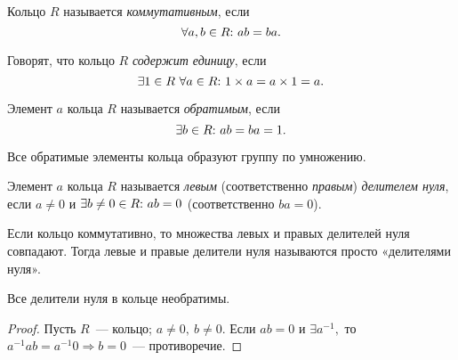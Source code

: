         \begin{comment}
        \begin{definition}
            Кольцо $R$ называется \textit{ассоциативным}, если 
		\begin{equation*}
			\forall a, b, c \in R\suchthat (ab)c = a(bc).
		\end{equation*}
	\end{definition}
        \end{comment}
	\begin{definition}
		Кольцо $R$ называется \textit{коммутативным}, если 
		\begin{equation*}
			\forall a, b \in R{:}{ } \  ab = ba.
		\end{equation*}
	\end{definition}
        \begin{definition}
            Говорят, что кольцо $R$ \textit{содержит единицу}, если
            \begin{equation*}
                \exists 1 \in R \ \forall a \in R{:}{ } \  1 \times a = a \times 1 = a.
            \end{equation*}
        \end{definition}
	\begin{definition}
		Элемент $a$ кольца $R$ называется \textit{обратимым}, если 
		\begin{equation*}
			\exists b \in R {:}{ } \  ab = ba = 1.
		\end{equation*}
	\end{definition}
	\begin{remark}
		Все обратимые элементы кольца образуют группу по умножению.
	\end{remark}
	\begin{definition}
		Элемент $a$ кольца $R$ называется \textit{левым} (соответственно \textit{правым}) \textit{делителем нуля}, если ${a \neq 0}$ и ${\exists b \neq 0 \in R {:}{ } \  ab = 0}$ (соответственно $ba = 0$).
	\end{definition}
	\begin{remark}
		Если кольцо коммутативно, то множества левых и правых делителей нуля совпадают. Тогда левые и правые делители нуля называются просто «делителями нуля».
	\end{remark}
	\begin{remark}
		Все делители нуля в кольце необратимы.
	\end{remark}
	\begin{proof}
		Пусть $R$~--- кольцо; ${a \neq 0, \ b \neq 0.}$ Если ${ab = 0}$ и ${\exists a^{-1},}$ то ${a^{-1}ab = a^{-1}0 \Rightarrow b = 0}$~--- противоречие.
	\end{proof}

